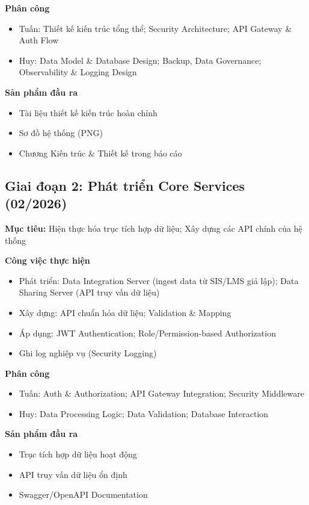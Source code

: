 \textbf{Phân công}

\begin{itemize}
    \item Tuấn: Thiết kế kiến trúc tổng thể; Security Architecture; API Gateway \& Auth Flow
    \item Huy: Data Model \& Database Design; Backup, Data Governance; Observability \& Logging Design
\end{itemize}

\textbf{Sản phẩm đầu ra}

\begin{itemize}
    \item Tài liệu thiết kế kiến trúc hoàn chỉnh
    \item Sơ đồ hệ thống (PNG)
    \item Chương Kiến trúc \& Thiết kế trong báo cáo
\end{itemize}

\subsection{Giai đoạn 2: Phát triển Core Services (02/2026)}
\textbf{Mục tiêu:} Hiện thực hóa trục tích hợp dữ liệu; Xây dựng các API chính của hệ thống

\textbf{Công việc thực hiện}

\begin{itemize}
    \item Phát triển: Data Integration Server (ingest data từ SIS/LMS giả lập); Data Sharing Server (API truy vấn dữ liệu)
    \item Xây dựng: API chuẩn hóa dữ liệu; Validation \& Mapping
    \item Áp dụng: JWT Authentication; Role/Permission-based Authorization

    \item Ghi log nghiệp vụ (Security Logging)
\end{itemize}

\textbf{Phân công}\begin{itemize}
    \item Tuấn: Auth \& Authorization; API Gateway Integration; Security Middleware
    \item Huy: Data Processing Logic; Data Validation; Database Interaction
\end{itemize}

\textbf{Sản phẩm đầu ra}

\begin{itemize}
    \item Trục tích hợp dữ liệu hoạt động
    \item API truy vấn dữ liệu ổn định
    \item Swagger/OpenAPI Documentation
\end{itemize}

